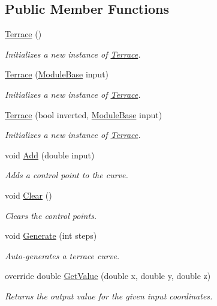 \subsection*{Public Member Functions}
\begin{DoxyCompactItemize}
\item 
\hyperlink{class_lib_noise_1_1_operator_1_1_terrace_a6b9c3c77fe6887b101fa6a37e0da3b63}{Terrace} ()
\begin{DoxyCompactList}\small\item\em Initializes a new instance of \hyperlink{class_lib_noise_1_1_operator_1_1_terrace}{Terrace}. \end{DoxyCompactList}\item 
\hyperlink{class_lib_noise_1_1_operator_1_1_terrace_ada82fd7c88b07402d18baca7ca52648f}{Terrace} (\hyperlink{class_lib_noise_1_1_module_base}{Module\+Base} input)
\begin{DoxyCompactList}\small\item\em Initializes a new instance of \hyperlink{class_lib_noise_1_1_operator_1_1_terrace}{Terrace}. \end{DoxyCompactList}\item 
\hyperlink{class_lib_noise_1_1_operator_1_1_terrace_a90908c6f5e64b1203087e3e94415cd8a}{Terrace} (bool inverted, \hyperlink{class_lib_noise_1_1_module_base}{Module\+Base} input)
\begin{DoxyCompactList}\small\item\em Initializes a new instance of \hyperlink{class_lib_noise_1_1_operator_1_1_terrace}{Terrace}. \end{DoxyCompactList}\item 
void \hyperlink{class_lib_noise_1_1_operator_1_1_terrace_a407835dc6f74c500cb3d5c2e1fbf820d}{Add} (double input)
\begin{DoxyCompactList}\small\item\em Adds a control point to the curve. \end{DoxyCompactList}\item 
void \hyperlink{class_lib_noise_1_1_operator_1_1_terrace_aa3b50fb77fbe93acbc0e99d9acaf6cc8}{Clear} ()
\begin{DoxyCompactList}\small\item\em Clears the control points. \end{DoxyCompactList}\item 
void \hyperlink{class_lib_noise_1_1_operator_1_1_terrace_adccf37178a207607ab332c622f900b66}{Generate} (int steps)
\begin{DoxyCompactList}\small\item\em Auto-\/generates a terrace curve. \end{DoxyCompactList}\item 
override double \hyperlink{class_lib_noise_1_1_operator_1_1_terrace_ac7d6b62e2dea66e5b3cbf5a02784e334}{Get\+Value} (double x, double y, double z)
\begin{DoxyCompactList}\small\item\em Returns the output value for the given input coordinates. \end{DoxyCompactList}\end{DoxyCompactItemize}
